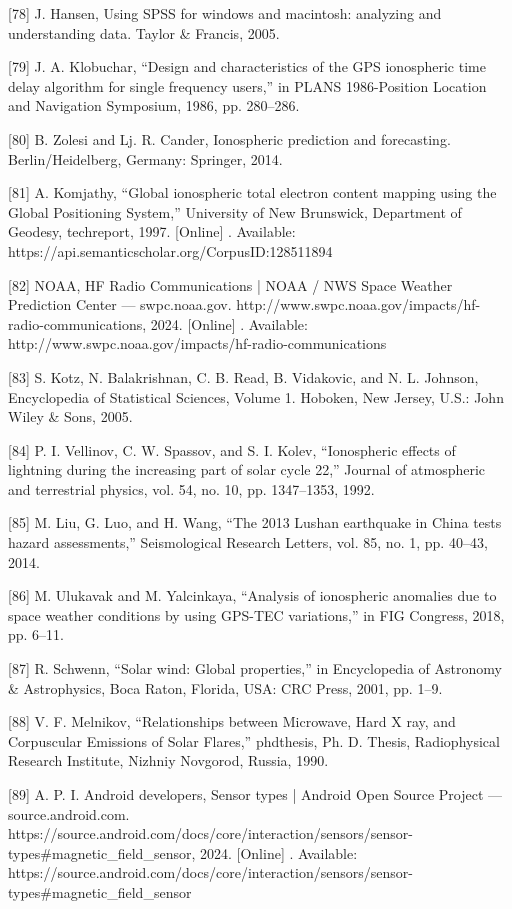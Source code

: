 \documentclass[sn-mathphys-num]{sn-jnl}%
\begin{document}
[78] J. Hansen, Using SPSS for windows and macintosh: analyzing and understanding data. Taylor & Francis, 2005.

[79] J. A. Klobuchar, “Design and characteristics of the GPS ionospheric time delay algorithm for single frequency users,” in PLANS 1986-Position Location and Navigation Symposium, 1986, pp. 280–286.

[80] B. Zolesi and Lj. R. Cander, Ionospheric prediction and forecasting. Berlin/Heidelberg, Germany: Springer, 2014.

[81] A. Komjathy, “Global ionospheric total electron content mapping using the Global Positioning System,” University of New Brunswick, Department of Geodesy, techreport, 1997. [Online] . Available: https://api.semanticscholar.org/CorpusID:128511894

[82] NOAA, HF Radio Communications | NOAA / NWS Space Weather Prediction Center — swpc.noaa.gov. http://www.swpc.noaa.gov/impacts/hf-radio-communications, 2024. [Online] . Available: http://www.swpc.noaa.gov/impacts/hf-radio-communications

[83] S. Kotz, N. Balakrishnan, C. B. Read, B. Vidakovic, and N. L. Johnson, Encyclopedia of Statistical Sciences, Volume 1. Hoboken, New Jersey, U.S.: John Wiley & Sons, 2005.

[84] P. I. Vellinov, C. W. Spassov, and S. I. Kolev, “Ionospheric effects of lightning during the increasing part of solar cycle 22,” Journal of atmospheric and terrestrial physics, vol. 54, no. 10, pp. 1347–1353, 1992.

[85] M. Liu, G. Luo, and H. Wang, “The 2013 Lushan earthquake in China tests hazard assessments,” Seismological Research Letters, vol. 85, no. 1, pp. 40–43, 2014.

[86] M. Ulukavak and M. Yalcinkaya, “Analysis of ionospheric anomalies due to space weather conditions by using GPS-TEC variations,” in FIG Congress, 2018, pp. 6–11.

[87] R. Schwenn, “Solar wind: Global properties,” in Encyclopedia of Astronomy & Astrophysics, Boca Raton, Florida, USA: CRC Press, 2001, pp. 1–9.

[88] V. F. Melnikov, “Relationships between Microwave, Hard X ray, and Corpuscular Emissions of Solar Flares,” phdthesis, Ph. D. Thesis, Radiophysical Research Institute, Nizhniy Novgorod, Russia, 1990.

[89] A. P. I. Android developers, Sensor types | Android Open Source Project — source.android.com. https://source.android.com/docs/core/interaction/sensors/sensor-types#magnetic_field_sensor, 2024. [Online] . Available: https://source.android.com/docs/core/interaction/sensors/sensor-types#magnetic_field_sensor
\end{document}
